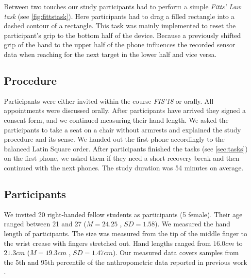 Between two touches our study participants had to perform a simple \textit{Fitts' Law task} (see \cref{fig:fittstask}). 
Here participants had to drag a filled rectangle into a dashed contour of a rectangle.
This task was mainly implemented to reset the participant's grip to the bottom half of the device.
Because a previously shifted grip of the hand to the upper half of the phone influences the recorded sensor data when reaching for the next target in the lower half and vice versa.
\subsection{Procedure}
Participants were either invited within the course \textit{FIS'18} or orally.
All appointments were discussed orally.
After participants have arrived they signed a consent form, and we continued measuring their hand length.
We asked the participants to take a seat on a chair without armrests and explained the study procedure and its sense.
We handed out the first phone accordingly to the balanced Latin Square order. 
After participants finished the tasks (see \cref{sec:tasks}) on the first phone, we asked them if they need a short recovery break and then continued with the next phones.
The study duration was 54 minutes on average.

\subsection{Participants}
We invited 20 right-handed fellow students as participants (5 female).
Their age ranged between 21 and 27 ($ M=24.25$ , $SD=1.58 $). 
We measured the hand length of participants. 
The size was measured from the tip of the middle finger to the wrist crease with fingers stretched out.
Hand lengths ranged from $16.0cm$ to $21.3cm$ ($M=19.3cm$ , $SD=1.47cm$).
Our measured data covers samples from the 5th and 95th percentile of the anthropometric data reported in previous work \cite{Poston}.  
